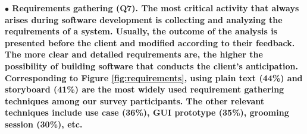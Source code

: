 
% 
% 
% 
% 
\nd\bf{$\bullet$ Requirements gathering (Q7).} The most critical activity that always arises
during software development is collecting and analyzing the requirements of a
system. Usually, the outcome of the analysis is presented before the client and
modified according to their feedback. The more clear and detailed requirements
are, the higher the possibility of building software that conducts the client’s
anticipation. Corresponding to Figure \ref{fig:requirements}, using plain text
(44\%) and storyboard (41\%) are the most widely used requirement gathering
techniques among our survey participants. The other relevant techniques include
use case (36\%), GUI prototype (35\%), grooming session (30\%), etc. 


